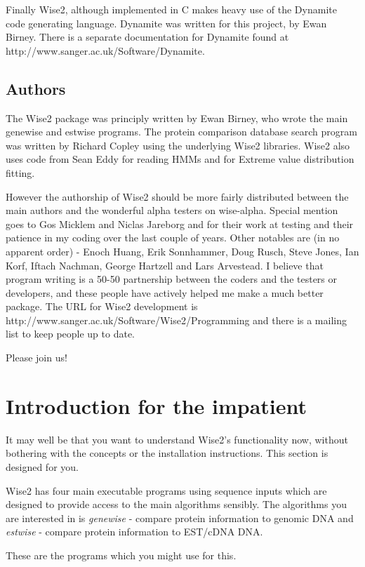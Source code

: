 \documentclass{article}
\begin{document}
Finally Wise2, although implemented in C makes heavy use of the Dynamite
code generating language. Dynamite was written for this project, by
Ewan Birney. There is a separate documentation for Dynamite found at
http://www.sanger.ac.uk/Software/Dynamite.

\subsection{Authors}

The Wise2 package was principly written by Ewan Birney, who wrote the
main genewise and estwise programs. The protein comparison database
search program was written by Richard Copley using the underlying
Wise2 libraries. Wise2 also uses code from Sean Eddy for reading HMMs
and for Extreme value distribution fitting.

However the authorship of Wise2 should be more fairly distributed
between the main authors and the wonderful alpha testers on
wise-alpha. Special mention goes to Gos Micklem and Niclas Jareborg
and for their work at testing and their patience in my coding over the
last couple of years. Other notables are (in no apparent order) -
Enoch Huang, Erik Sonnhammer, Doug Rusch, Steve Jones, Ian Korf,
Iftach Nachman, George Hartzell and Lars Arvestead. I believe that
program writing is a 50-50 partnership between the coders and the
testers or developers, and these people have actively helped me make a
much better package. The URL for Wise2 development is
http://www.sanger.ac.uk/Software/Wise2/Programming and there is a
mailing list to keep people up to date.

Please join us! 


\newpage
\section{Introduction for the impatient}

It may well be that you want to understand Wise2's functionality now,
without bothering with the concepts or the installation instructions.
This section is designed for you.

Wise2 has four main executable programs using sequence inputs which
are designed to provide access to the main algorithms sensibly. The
algorithms you are interested in is \emph{genewise} - compare protein
information to genomic DNA and \emph{estwise} - compare protein 
information to EST/cDNA DNA.

These are the programs which you might use for this.
\end{document}
